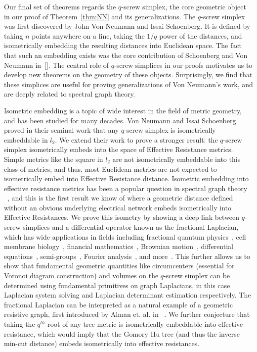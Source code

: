 Our final set of theorems regards the $q$-screw simplex, the core geometric
object in our proof of Theorem~\ref{thm:NN} and its generalizations. The
$q$-screw simplex was first discovered by John Von Neumann and Issai
Schoenberg. It is defined by taking $n$ points anywhere on a line, taking
the $1/q$ power of the distances, and isometrically embedding the resulting
distances into Euclidean space. The fact that such an embedding exists was
the core contribution of Schoenberg and Von Neumann in~\ref{}. The central
role of $q$-screw simplices in our proofs motivates us to develop new
theorems on the geometry of these objects. Surprisingly, we find that these
simplices are useful for proving generalizations of Von Neumann's work, and
are deeply related to spectral graph theory.

Isometric embedding is a topic of wide interest in the field of metric
geometry, and has been studied for many decades. Von Neumann and Issai
Schoenberg proved in their seminal work that any $q$-screw simplex is
isometrically embeddable in $l_2$. We extend their work to prove a stronger
result: the $q$-screw simplex isometrically embeds into the space of
Effective Resistance metrics. Simple metrics like the square in $l_2$ are
not isometrically embeddable into this class of metrics, and thus, most
Euclidean metrics are not expected to isometrically embed into Effective
Resistance distance. Isometric embedding into effective resistance metrics
has been a popular question in spectral graph theory ~\cite{}, and this is
the first result we know of where a geometric distance defined without an
obvious underlying electrical network embeds isometrically into Effective
Resistances. We prove this isometry by showing a deep link between
$q$-screw simplices and a differential operator known as the fractional
Laplacian, which has wide applications in fields including fractional
quantum physics~\cite{}, cell membrane biology~\cite{}, financial
mathematics~\cite{}, Brownian motion~\cite{}, differential
equations~\cite{}, semi-groups~\cite{}, Fourier analysis~\cite{}, and
more~\cite{}. This further allows us to show that fundamental geometric
quantities like circumcenters (essential for Voronoi diagram construction)
and volumes on the $q$-screw simplex can be determined using fundamental
primitives on graph Laplacians, in this case Laplacian system solving and
Laplacian determinant estimation respectively. The fractional Laplacian can
be interpreted as a natural example of a geometric resistive graph, first
introduced by Alman et. al. in ~\cite{}. We further conjecture that taking
the $q^{th}$ root of any tree metric is isometrically embeddable into
effective resistance, which would imply that the Gomory Hu tree (and thus
the inverse min-cut distance) embeds isometrically into effective
resistances.


